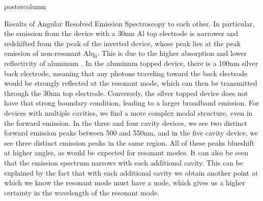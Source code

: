 \documentclass[papersize={24in,36in}]{beamer}
\begin{document}
\begin{frame}
\begin{columns}
\begin{column}{.49\textwidth}
\begin{beamercolorbox}[center,wd=\textwidth]{postercolumn}
\begin{minipage}[T]{.95\textwidth}
{\begin{block}{Results of Angular Resolved Emission Spectroscopy}
				to each other. In particular, the emission from the device with a 30nm Al top electrode is narrower and redshifted from the peak of the inverted device, whose peak lies at the peak emission of non-resonant Alq$_3$. This is due to the higher absorption and lower reflectivity of aluminum \cite{Schulz1954}. In the aluminum topped device, there is a 100nm silver back electrode, meaning that any photons traveling toward the back electrode would be strongly reflected at the resonant mode, which can then be transmitted through the 30nm top electrode. Conversely, the silver topped device does not have that strong boundary condition, leading to a larger broadband emission. For devices with multiple cavities, we find a more complex modal structure, even in the forward emission. In the three and four cavity devices, we see two distinct forward emission peaks between 500 and 550nm, and in the five cavity device, we see three distinct emission peaks in the same region. All of these peaks blueshift at higher angles, as would be expected for resonant modes. It can also be seen that the emission spectrum narrows with each additional cavity. This can be explained by the fact that with each additional cavity we obtain another point at which we know the resonant mode must have a node, which gives us a higher certainty in the wavelength of the resonant mode.


\end{block}}
\end{minipage}
\end{beamercolorbox}
\end{column}
\end{columns}
\end{frame}
\end{document}
